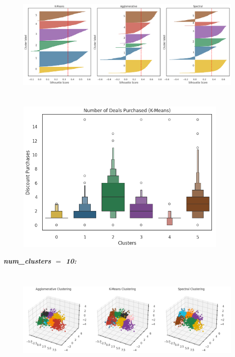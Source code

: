 \documentclass[11pt]{article}
\begin{document}
\begin{figure}[H]
\includegraphics[width=14.59cm,height=5.7cm]{./images/image35.png}
\end{figure}


\begin{figure}[H]
\centering
\includegraphics[width=10.42cm,height=7.55cm]{./images/image10.png}
\end{figure}


\vspace{2\baselineskip}
\begin{center}
\textbf{\textit{num\_clusters $=$ 10:}}
\end{center}


\vspace{1\baselineskip}
\begin{figure}[H]
\includegraphics[width=15.92cm,height=5.08cm]{./images/image27.png}
\end{figure}
\end{document}
